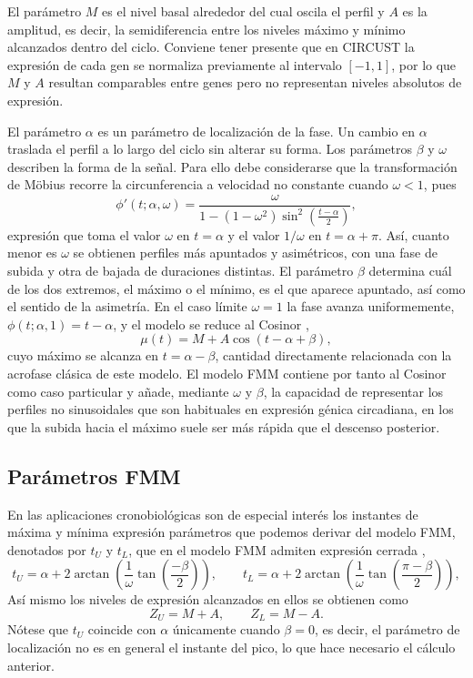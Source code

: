 \documentclass[12pt, a4paper]{report}
\begin{document}
El parámetro \(M\) es el nivel basal alrededor del cual oscila el perfil y \(A\) es la amplitud, es decir, la semidiferencia entre los niveles máximo y mínimo alcanzados dentro del ciclo. Conviene tener presente que en CIRCUST la expresión de cada gen se normaliza previamente al intervalo \([-1,1]\), por lo que \(M\) y \(A\) resultan comparables entre genes pero no representan niveles absolutos de expresión.

El parámetro \(\alpha\) es un parámetro de localización de la fase. Un cambio en \(\alpha\) traslada el perfil a lo largo del ciclo sin alterar su forma. Los parámetros \(\beta\) y \(\omega\) describen la forma de la señal. Para ello debe considerarse que la transformación de Möbius recorre la circunferencia a velocidad no constante cuando \(\omega<1\), pues
\[
\phi'(t;\alpha,\omega)=
\frac{\omega}{1-(1-\omega^{2})\sin^{2}\!\left(\frac{t-\alpha}{2}\right)},
\]
expresión que toma el valor \(\omega\) en \(t=\alpha\) y el valor \(1/\omega\) en \(t=\alpha+\pi\). Así, cuanto menor es \(\omega\) se obtienen perfiles más apuntados y asimétricos, con una fase de subida y otra de bajada de duraciones distintas. El parámetro \(\beta\) determina cuál de los dos extremos, el máximo o el mínimo, es el que aparece apuntado, así como el sentido de la asimetría. En el caso límite \(\omega=1\) la fase avanza uniformemente, \(\phi(t;\alpha,1)=t-\alpha\), y el modelo se reduce al Cosinor \citep{cosinor},
\[
\mu(t)=M+A\cos\!\left(t-\alpha+\beta\right),
\]
cuyo máximo se alcanza en \(t=\alpha-\beta\), cantidad directamente relacionada con la acrofase clásica de este modelo. El modelo FMM contiene por tanto al Cosinor como caso particular y añade, mediante \(\omega\) y \(\beta\), la capacidad de representar los perfiles no sinusoidales que son habituales en expresión génica circadiana, en los que la subida hacia el máximo suele ser más rápida que el descenso posterior.

\subsection{Parámetros FMM}

En las aplicaciones cronobiológicas son de especial interés los instantes de máxima y mínima expresión parámetros que podemos derivar del modelo FMM, denotados por \(t_U\) y \(t_L\), que en el modelo FMM admiten expresión cerrada \citep{fmmAlgorithm},
\[
t_{U}=\alpha+2\arctan\!\left(\frac{1}{\omega}\tan\left(\frac{-\beta}{2}\right)\right),
\qquad
t_{L}=\alpha+2\arctan\!\left(\frac{1}{\omega}\tan\left(\frac{\pi-\beta}{2}\right)\right),
\]
Así mismo los niveles de expresión alcanzados en ellos se obtienen como
\[
Z_{U}=M+A,
\qquad
Z_{L}=M-A .
\]
Nótese que \(t_U\) coincide con \(\alpha\) únicamente cuando \(\beta=0\), es decir, el parámetro de localización no es en general el instante del pico, lo que hace necesario el cálculo anterior.
\end{document}

